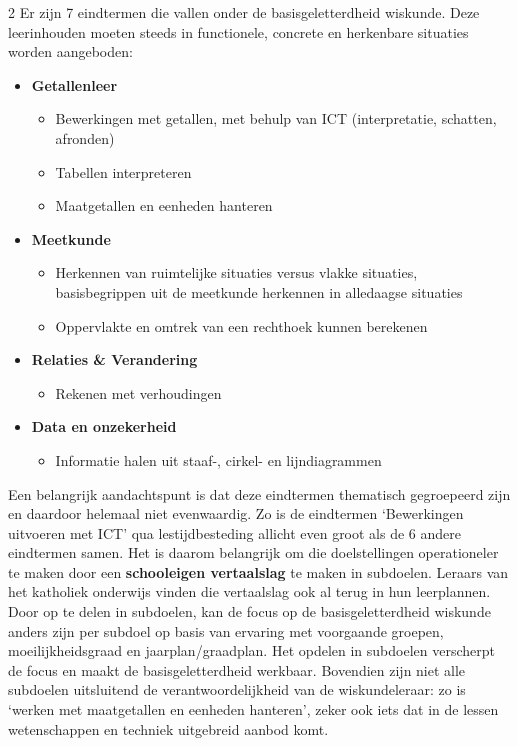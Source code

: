 \begin{multicols}{2}
Er zijn 7 eindtermen die vallen onder de basisgeletterdheid wiskunde. Deze leerinhouden moeten steeds in functionele, concrete en herkenbare situaties worden aangeboden:
\begin{itemize}
    \item \textbf{Getallenleer}
    \begin{itemize}
        \item Bewerkingen met getallen, met behulp van ICT (interpretatie, schatten, afronden)
        \item Tabellen interpreteren
        \item Maatgetallen en eenheden hanteren
    \end{itemize}
      \item \textbf{Meetkunde}
    \begin{itemize}
        \item Herkennen van ruimtelijke situaties versus vlakke situaties, basisbegrippen uit de meetkunde herkennen in alledaagse situaties
        \item Oppervlakte en omtrek van een rechthoek kunnen berekenen
    \end{itemize}
      \item \textbf{Relaties \& Verandering}
    \begin{itemize}
        \item Rekenen met verhoudingen
    \end{itemize}
      \item \textbf{Data en onzekerheid}
    \begin{itemize}
        \item Informatie halen uit staaf-, cirkel- en lijndiagrammen
    \end{itemize}
\end{itemize}

Een belangrijk aandachtspunt is dat deze eindtermen thematisch gegroepeerd zijn en daardoor helemaal niet evenwaardig. Zo is de eindtermen `Bewerkingen uitvoeren met ICT' qua lestijdbesteding allicht even groot als de 6 andere eindtermen samen. Het is daarom belangrijk om die doelstellingen operationeler te maken door een \textbf{schooleigen vertaalslag} te maken in subdoelen. Leraars van het katholiek onderwijs vinden die vertaalslag ook al terug in hun leerplannen.  Door op te delen in subdoelen, kan de focus op de basisgeletterdheid wiskunde anders zijn per subdoel op basis van ervaring met voorgaande groepen, moeilijkheidsgraad en jaarplan/graadplan. Het opdelen in subdoelen verscherpt de focus en maakt de basisgeletterdheid werkbaar.  Bovendien zijn niet alle subdoelen uitsluitend de verantwoordelijkheid van de wiskundeleraar: zo is `werken met maatgetallen en eenheden hanteren', zeker ook iets dat in de lessen wetenschappen en techniek uitgebreid aanbod komt. 


\end{multicols}
